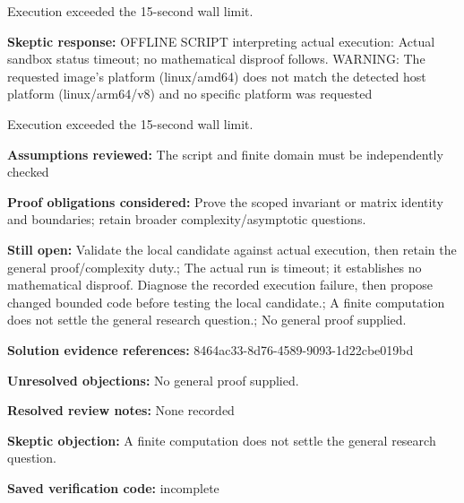 \documentclass[11pt]{article}
\begin{document}
Execution exceeded the 15-second wall limit.\par
\textbf{Skeptic response:} OFFLINE SCRIPT interpreting actual execution: Actual sandbox status timeout; no mathematical disproof follows. WARNING: The requested image's platform (linux/amd64) does not match the detected host platform (linux/arm64/v8) and no specific platform was requested

Execution exceeded the 15-second wall limit.\par
\textbf{Assumptions reviewed:} The script and finite domain must be independently checked\par
\textbf{Proof obligations considered:} Prove the scoped invariant or matrix identity and boundaries; retain broader complexity/asymptotic questions.\par
\textbf{Still open:} Validate the local candidate against actual execution, then retain the general proof/complexity duty.; The actual run is timeout; it establishes no mathematical disproof. Diagnose the recorded execution failure, then propose changed bounded code before testing the local candidate.; A finite computation does not settle the general research question.; No general proof supplied.\par
\textbf{Solution evidence references:} 8464ac33-8d76-4589-9093-1d22cbe019bd\par
\textbf{Unresolved objections:} No general proof supplied.\par
\textbf{Resolved review notes:} None recorded\par
\textbf{Skeptic objection:} A finite computation does not settle the general research question.\par
\textbf{Saved verification code:} incomplete\par
\end{document}
